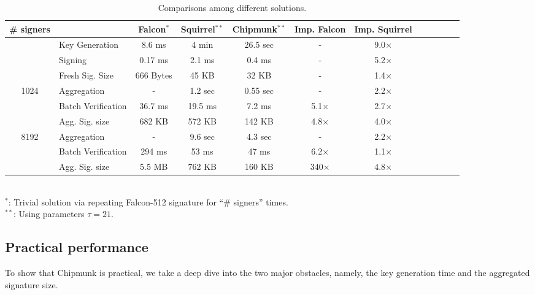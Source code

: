\begin{table}\centering
  \begin{tabular}{|c||l|c|c|c||c|c|c|c||c|c|c|}\hline
    \# signers      &                 & Falcon$^{*}$& Squirrel$^{**}$  & Chipmunk$^{**}$  & Imp. Falcon & Imp. Squirrel \\\hline\hline
    \multirow{2}{*}{} 
                    & Key Generation  & 8.6 ms      & 4 min     & 26.5 sec  &     -       & 9.0$\times$ \\\cline{2-7}
                    & Signing         & 0.17 ms     & 2.1 ms    & 0.4 ms    &     -       & 5.2$\times$ \\\cline{2-7}
                    &Fresh Sig. Size  & 666 Bytes   & 45 KB     & 32 KB     &     -       & 1.4$\times$ \\\hline\hline
    \multirow{3}{*}{1024}                
                    &Aggregation      & -           & 1.2 sec   & 0.55 sec  &     -       & 2.2$\times$ \\\cline{2-7}
                    &Batch Verification    
                                      & 36.7 ms     & 19.5 ms   & 7.2 ms    & 5.1$\times$ & 2.7$\times$ \\\cline{2-7}
                    
                    &Agg. Sig. size   & 682 KB      & 572 KB    & 142 KB    & 4.8$\times$ & 4.0$\times$ \\\hline\hline
    \multirow{3}{*}{8192}                
                    &Aggregation      & -           & 9.6 sec   & 4.3 sec   &     -       & 2.2$\times$ \\\cline{2-7}
                    &Batch Verification    
                                      & 294 ms      & 53  ms    &  47 ms    & 6.2$\times$ & 1.1$\times$ \\\cline{2-7}
                    &Agg. Sig. size   & 5.5 MB      & 762 KB    & 160 KB    & 340$\times$ & 4.8$\times$ \\\hline
  \end{tabular}\\
  $^{*}$: Trivial solution via repeating Falcon-512 signature for ``\# signers'' times.\\
  $^{**}$: Using parameters $\tau=21$.
  \caption{Comparisons among different solutions.}
\end{table}

\subsection{Practical performance}
To show that Chipmunk is practical, 
we take a deep dive into the two major obstacles, namely, the key generation time and the aggregated signature size.

